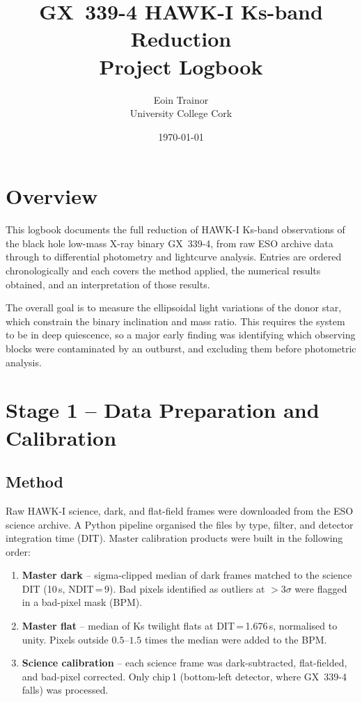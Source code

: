 \documentclass[12pt,a4paper]{article}
\title{\textbf{GX~339-4 HAWK-I Ks-band Reduction}\\[4pt]
       {\large Project Logbook}}
\author{Eoin Trainor \\ University College Cork}
\date{\today}
\begin{document}
\maketitle
\tableofcontents
\newpage

\section*{Overview}

This logbook documents the full reduction of HAWK-I Ks-band observations of
the black hole low-mass X-ray binary GX~339-4, from raw ESO archive data
through to differential photometry and lightcurve analysis.  Entries are
ordered chronologically and each covers the method applied, the numerical
results obtained, and an interpretation of those results.

The overall goal is to measure the ellipsoidal light variations of the
donor star, which constrain the binary inclination and mass ratio.  This
requires the system to be in deep quiescence, so a major early finding was
identifying which observing blocks were contaminated by an outburst, and
excluding them before photometric analysis.

\section{Stage 1 -- Data Preparation and Calibration}

\subsection{Method}
Raw HAWK-I science, dark, and flat-field frames were downloaded from the
ESO science archive.  A Python pipeline organised the files by type,
filter, and detector integration time (DIT).  Master calibration products
were built in the following order:

\begin{enumerate}
  \item \textbf{Master dark} -- sigma-clipped median of dark frames matched
        to the science DIT (10\,s, NDIT\,=\,9).  Bad pixels identified as
        outliers at $>3\sigma$ were flagged in a bad-pixel mask (BPM).
  \item \textbf{Master flat} -- median of Ks twilight flats at DIT\,=\,1.676\,s,
        normalised to unity.  Pixels outside $0.5$--$1.5$ times the median
        were added to the BPM.
  \item \textbf{Science calibration} -- each science frame was
        dark-subtracted, flat-fielded, and bad-pixel corrected.  Only
        chip\,1 (bottom-left detector, where GX~339-4 falls) was processed.
\end{enumerate}
\end{document}
